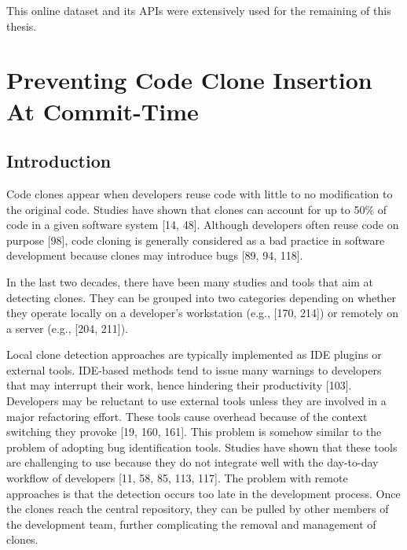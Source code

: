 \documentclass[12pt]{report}
\begin{document}
This online dataset and its APIs were extensively used for the remaining
of this thesis.

\chapter{Preventing Code Clone Insertion At
Commit-Time}\label{preventing-code-clone-insertion-at-commit-time}

\section{Introduction}\label{introduction-2}

Code clones appear when developers reuse code with little to no
modification to the original code. Studies have shown that clones can
account for up to 50\% of code in a given software system {[}14, 48{]}.
Although developers often reuse code on purpose {[}98{]}, code cloning
is generally considered as a bad practice in software development
because clones may introduce bugs {[}89, 94, 118{]}.

In the last two decades, there have been many studies and tools that aim
at detecting clones. They can be grouped into two categories depending
on whether they operate locally on a developer's workstation (e.g.,
{[}170, 214{]}) or remotely on a server (e.g., {[}204, 211{]}).

Local clone detection approaches are typically implemented as IDE
plugins or external tools. IDE-based methods tend to issue many warnings
to developers that may interrupt their work, hence hindering their
productivity {[}103{]}. Developers may be reluctant to use external
tools unless they are involved in a major refactoring effort. These
tools cause overhead because of the context switching they provoke
{[}19, 160, 161{]}. This problem is somehow similar to the problem of
adopting bug identification tools. Studies have shown that these tools
are challenging to use because they do not integrate well with the
day-to-day workflow of developers {[}11, 58, 85, 113, 117{]}. The
problem with remote approaches is that the detection occurs too late in
the development process. Once the clones reach the central repository,
they can be pulled by other members of the development team, further
complicating the removal and management of clones.
\end{document}
